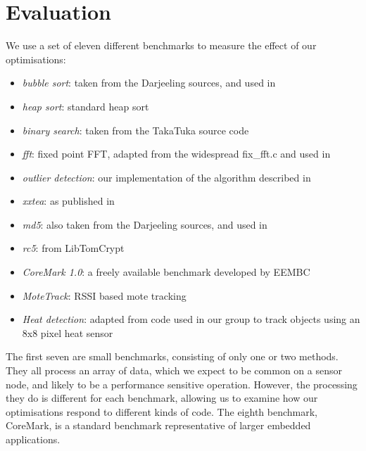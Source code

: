 \chapter{Evaluation}
\label{sec-evaluation}

We use a set of eleven different benchmarks to measure the effect of our optimisations:

\begin{itemize}
\item \emph{bubble sort}: taken from the Darjeeling sources, and used in \cite{Brouwers:2009cj, Ellul:2012thesis}
\item \emph{heap sort}: standard heap sort \cite{heapsort}
\item \emph{binary search}: taken from the TakaTuka \cite{Aslam:2008} source code
\item \emph{fft}: fixed point FFT, adapted from the widespread fix\_fft.c and used in \cite{Kumar:2007ge}
\item \emph{outlier detection}: our implementation of the algorithm described in \cite{Kumar:2007ge}
\item \emph{xxtea}: as published in \cite{Wheeler:1998}
\item \emph{md5}: also taken from the Darjeeling sources, and used in \cite{Brouwers:2009cj, Ellul:2012thesis}
\item \emph{rc5}: from LibTomCrypt \cite{libtomcrypt}
\item \emph{CoreMark 1.0}: a freely available benchmark developed by EEMBC \cite{coremark}
\item \emph{MoteTrack}: RSSI based mote tracking \cite{motetrack, Lorincz:2006fc}
\item \emph{Heat detection}: adapted from code used in our group to track objects using an 8x8 pixel heat sensor
\end{itemize}

The first seven are small benchmarks, consisting of only one or two methods. They all process an array of data, which we expect to be common on a sensor node, and likely to be a performance sensitive operation. However, the processing they do is different for each benchmark, allowing us to examine how our optimisations respond to different kinds of code. The eighth benchmark, CoreMark, is a standard benchmark representative of larger embedded applications.

